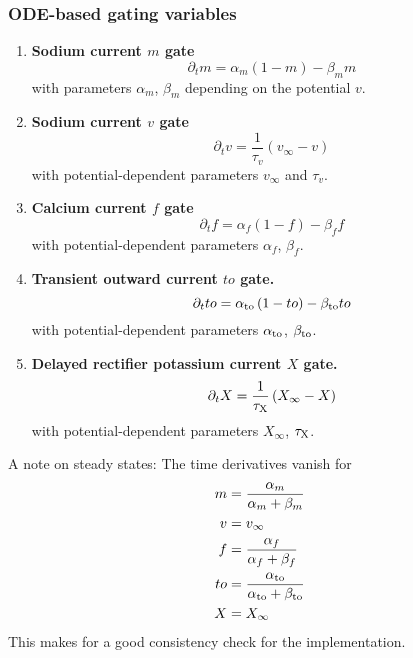 \documentclass{scrartcl}
\begin{document}
\subsubsection{ODE-based gating variables}
\begin{enumerate}
\item {\bf Sodium current $m$ gate}
\begin{equation}
	\partial_t m = \alpha_m \left(1 - m \right) - \beta_m m
\end{equation}
with parameters $\alpha_m$, $\beta_m$ depending on the potential $v$.
\item {\bf Sodium current $v$ gate}
\begin{equation}
	\partial_t v = \frac{1}{\tau_v} \left( v_{\infty} - v \right)
\end{equation}
with potential-dependent parameters $v_{\infty}$ and $\tau_v$.
\item {\bf Calcium current $f$ gate}
\begin{equation}
	\partial_t f = \alpha_f \left( 1 - f \right)  - \beta_f f
\end{equation}
with potential-dependent parameters $\alpha_f$, $\beta_f$.
\item {\bf Transient outward current $to$ gate.}
\begin{equation}
	\partial_t to = \alpha_{\rm to} \left(1 - to \right) - \beta_{\rm to} to
\end{equation}
with potential-dependent parameters $\alpha_{\rm to}$, $\beta_{\rm to}$.
\item {\bf Delayed rectifier potassium current $X$ gate.}
\begin{equation}
	\partial_t X = \frac{1}{\tau_{\rm X}} \left( X_{\infty} - X \right)
\end{equation}
with potential-dependent parameters $X_{\infty}$, $\tau_{\rm X}$.
\end{enumerate}
A note on steady states: The time derivatives vanish for
\begin{subequations}
\begin{align}
	m &= \frac{\alpha_m}{\alpha_m + \beta_m} \\
	v &= v_{\infty} \\
	f &= \frac{\alpha_f}{\alpha_f + \beta_f} \\
	to &= \frac{\alpha_{\rm to}}{\alpha_{\rm to} + \beta_{\rm to}} \\
	X &= X_{\infty}
\end{align}
\end{subequations}
This makes for a good consistency check for the implementation.
%
%
\end{document}
